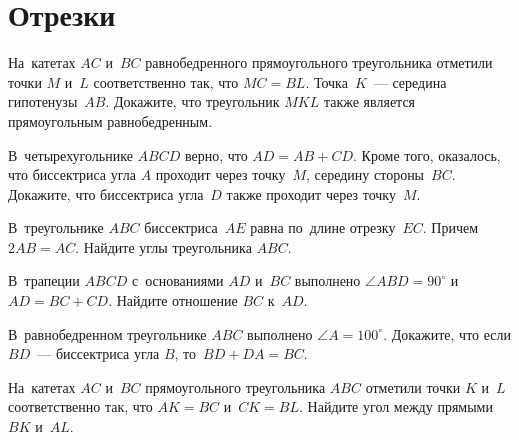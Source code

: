 
\section*{Отрезки}


\begin{problems}

\item
На~катетах $AC$ и~$BC$ равнобедренного прямоугольного треугольника отметили
точки $M$ и~$L$ соответственно так, что $MC = BL$.
Точка~$K$~--- середина гипотенузы~$AB$.
Докажите, что треугольник $MKL$ также является прямоугольным равнобедренным.

\item
В~четырехугольнике $ABCD$ верно, что $AD = AB + CD$.
Кроме того, оказалось, что биссектриса угла $A$ проходит через точку~$M$,
середину стороны~$BC$.
Докажите, что биссектриса угла~$D$ также проходит через точку~$M$.

\item
В~треугольнике $ABC$ биссектриса~$AE$ равна по~длине отрезку~$EC$.
Причем $2 AB = AC$.
Найдите углы треугольника $ABC$.

\item
В~трапеции $ABCD$ с~основаниями $AD$ и~$BC$ выполнено $\angle ABD = 90^{\circ}$
и~$AD = BC + CD$.
Найдите отношение $BC$ к~$AD$.

\item
В~равнобедренном треугольнике $ABC$ выполнено $\angle A = 100^{\circ}$.
Докажите, что если $BD$~--- биссектриса угла $B$, то~$BD + DA = BC$.

\item
На~катетах $AC$ и~$BC$ прямоугольного треугольника $ABC$ отметили
точки $K$ и~$L$ соответственно так, что $AK = BC$ и~$CK = BL$.
Найдите угол между прямыми $BK$ и~$AL$.

\end{problems}

